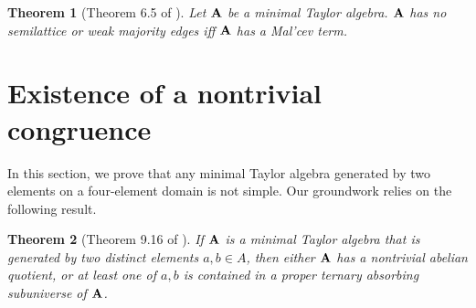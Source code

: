 \documentclass[11pt]{amsart}
\newcommand{\m}[1]{\mathbf{\uppercase{#1}}}
\newtheorem{thm}{Theorem}
\newtheorem{prp}[thm]{Proposition}
\theoremstyle{definition}
\theoremstyle{remark}
\theoremstyle{plain}
\begin{document}
\begin{thm}[Theorem 6.5 of \cite{dreamteam}]\label{Malcevcriterionedges}
Let $\m a$ be a minimal Taylor algebra. $\m a$ has no semilattice or weak majority edges iff $\m a$ has a Mal'cev term.
\end{thm}

\section{Existence of a nontrivial congruence}


\thispagestyle{empty}
In this section, we prove that any minimal Taylor algebra generated by two elements on a four-element domain is not simple. Our groundwork relies on the following result.

\begin{thm}[Theorem 9.16 of \cite{dreamteam}]\label{center} 
If ${\m A}$ is a minimal Taylor algebra that is generated by two distinct elements $a,b \in A$, then either $\m A$ has a nontrivial abelian quotient, or at least one of $a,b$ is contained in a proper ternary absorbing subuniverse of $\m A$.
\end{thm}








\end{document}
